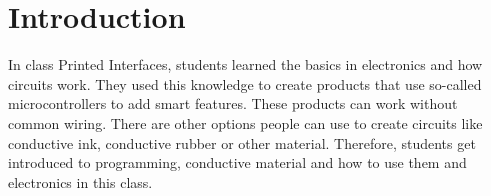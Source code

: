 \documentclass[00_doc.tex]{subfiles}
\begin{document}
    \section{Introduction}
    \begin{flushleft}
        In class Printed Interfaces, students learned the basics in electronics and how circuits work. 
        They used this knowledge to create products that use so-called microcontrollers to add smart features.
        These products can work without common wiring. There are other options people can use to 
        create circuits like conductive ink, conductive rubber or other material. 
        Therefore, students get introduced to programming, conductive material and how to use them
        and electronics in this class.
    \end{flushleft}
\end{document}
